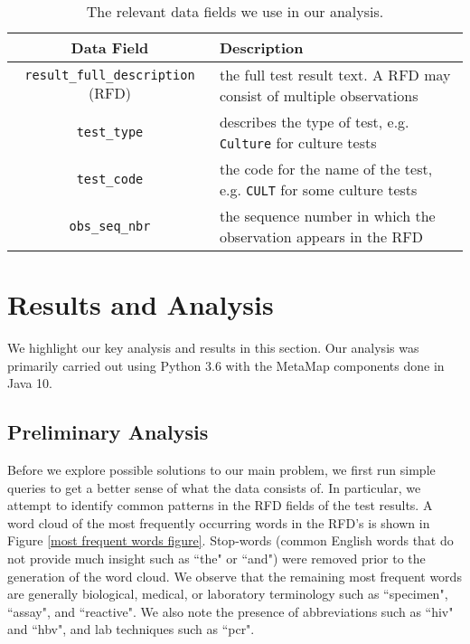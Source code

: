 \documentclass[11pt]{article}
\begin{document}
\begin{table}[ht]
\begin{center}
\begin{tabular}{|c|p{9.5cm}|}
    \hline
    \rowcolor{Gray}
    \textbf{Data Field} & \textbf{Description} \\
    \hline
    \verb|result_full_description| (RFD) & the full test result text. A RFD may consist of multiple observations \\
    \hline
    \rowcolor{LightGray}
    \verb|test_type| & describes the type of test, e.g. \verb|Culture| for culture tests \\
    \hline
    \verb|test_code| & the code for the name of the test, e.g. \verb|CULT| for some culture tests \\
    \hline
    \rowcolor{LightGray}
    \verb|obs_seq_nbr| & the sequence number in which the observation appears in the RFD \\
    \hline
\end{tabular}
\caption{The relevant data fields we use in our analysis.}
\label{data fields}
\end{center}
\end{table}


\section{Results and Analysis} \label{results and analysis}

We highlight our key analysis and results in this section. Our analysis was primarily carried out using Python 3.6 with the MetaMap components done in Java 10.


\subsection{Preliminary Analysis} \label{preliminary analysis}

Before we explore possible solutions to our main problem, we first run simple queries to get a better sense of what the data consists of. In particular, we attempt to identify common patterns in the RFD fields of the test results. A word cloud of the most frequently occurring words in the RFD's is shown in Figure \ref{most frequent words figure}. Stop-words (common English words that do not provide much insight such as ``the" or ``and") were removed prior to the generation of the word cloud. We observe that the remaining most frequent words are generally biological, medical, or laboratory terminology such as ``specimen", ``assay", and ``reactive". We also note the presence of abbreviations such as ``hiv" and ``hbv", and lab techniques such as ``pcr".
\end{document}
